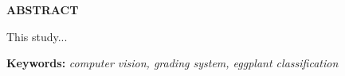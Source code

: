 \begin{center}
{\bf ABSTRACT}\\[36pt]
\end{center}
{\baselineskip

This study...

}
\bigskip
\textbf{Keywords:} \textit{computer vision, grading system, eggplant classification}
